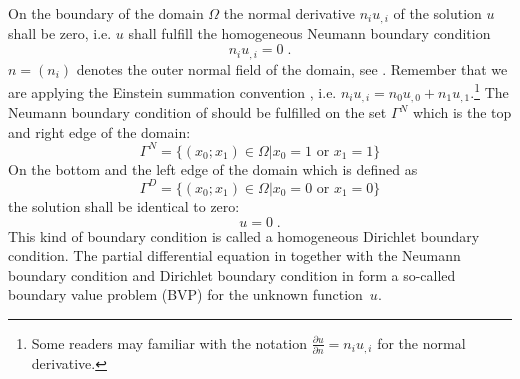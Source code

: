 On the boundary of the domain $\Omega$ the normal derivative $n_{i} u_{,i}$
of the solution $u$ shall be zero, i.e. $u$ shall fulfill
the homogeneous Neumann boundary condition
\begin{equation}
n_{i} u_{,i}= 0 \;.
\label{eq:FirstSteps.2}
\end{equation}
$n=(n_{i})$ denotes the outer normal field
of the domain, see . Remember that we 
are applying the Einstein summation convention , i.e. $n_{i} u_{,i}= n_{0} u_{,0} +%
n_{1} u_{,1}$.\footnote{Some readers may familiar with the
notation $\frac{\partial u}{\partial n} = n_{i} u_{,i}$
for the normal derivative.}
The Neumann boundary condition of  should be fulfilled on the
set $\Gamma^N$ which is the top and right edge of the domain:
\begin{equation}
    \Gamma^N=\{(x_0;x_1) \in \Omega | x_{0}=1 \mbox{ or } x_{1}=1  \}
    \label{eq:FirstSteps.2b}
\end{equation}
On the bottom and the left edge of the domain which is defined
as 
\begin{equation}
    \Gamma^D=\{(x_0;x_1) \in \Omega | x_{0}=0 \mbox{ or } x_{1}=0  \}
    \label{eq:FirstSteps.2c}
\end{equation}
the solution shall be identical to zero:
\begin{equation}
    u=0 \; .
    \label{eq:FirstSteps.2d}
\end{equation}
This kind of boundary condition is called a homogeneous Dirichlet boundary
condition.
The partial differential equation in  together
with the Neumann boundary condition  and 
Dirichlet boundary condition in  form a so-called
boundary value
problem (BVP)
for the unknown function~$u$. 


